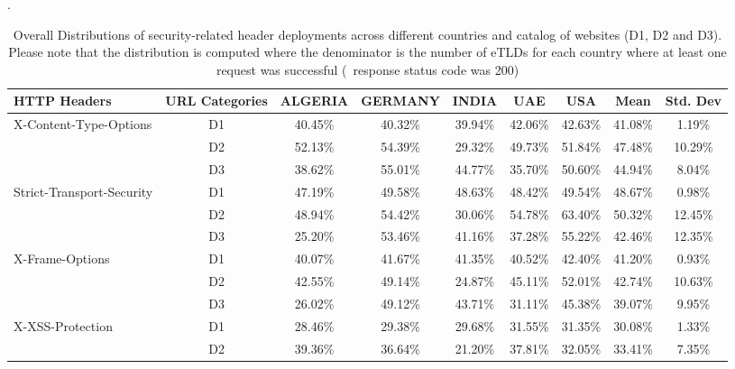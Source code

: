 \begin{table}[!ht]
\centering
\footnotesize
\caption{Overall Distributions of security-related header deployments across different countries and catalog of websites (D1, D2 and D3). Please note that the distribution is computed where the denominator is the number of eTLDs for each country where at least one request was successful (\eg~response status code was 200)}.
\label{tab:d1_headers}
    \begin{tabular}{l|c|c|c|c|c|c|c|c}
    \toprule
        HTTP Headers & URL Categories & ALGERIA & GERMANY & INDIA & UAE & USA & Mean & Std. Dev \\ \midrule
        \multirow{3}{*}{X-Content-Type-Options} & D1 & 40.45\% & 40.32\% & 39.94\% & 42.06\% & 42.63\% & 41.08\% & 1.19\% \\
        ~ & D2 & 52.13\% & 54.39\% & 29.32\% & 49.73\% & 51.84\% & 47.48\% & 10.29\% \\
        ~ & D3 & 38.62\% & 55.01\% & 44.77\% & 35.70\% & 50.60\% & 44.94\% & 8.04\% \\ \hline
        \multirow{3}{*}{Strict-Transport-Security} & D1 & 47.19\% & 49.58\% & 48.63\% & 48.42\% & 49.54\% & 48.67\% & 0.98\% \\
        ~ & D2 & 48.94\% & 54.42\% & 30.06\% & 54.78\% & 63.40\% & 50.32\% & 12.45\% \\
        ~ & D3 & 25.20\% & 53.46\% & 41.16\% & 37.28\% & 55.22\% & 42.46\% & 12.35\% \\ \hline
        \multirow{3}{*}{X-Frame-Options} & D1 & 40.07\% & 41.67\% & 41.35\% & 40.52\% & 42.40\% & 41.20\% & 0.93\% \\
        ~ & D2 & 42.55\% & 49.14\% & 24.87\% & 45.11\% & 52.01\% & 42.74\% & 10.63\% \\
        ~ & D3 & 26.02\% & 49.12\% & 43.71\% & 31.11\% & 45.38\% & 39.07\% & 9.95\% \\ \hline
        \multirow{3}{*}{X-XSS-Protection} & D1 & 28.46\% & 29.38\% & 29.68\% & 31.55\% & 31.35\% & 30.08\% & 1.33\% \\
        ~ & D2 & 39.36\% & 36.64\% & 21.20\% & 37.81\% & 32.05\% & 33.41\% & 7.35\% \\

\end{tabular}
\end{table}
